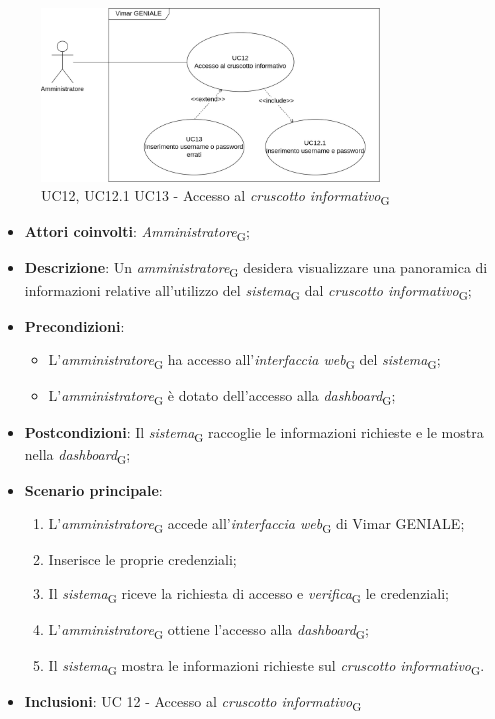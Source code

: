 \begin{figure}[H]
\centering
\includegraphics[width=0.8\textwidth]{contents/casi_duso/png/UC12.png}
\caption{UC12, UC12.1 UC13 - Accesso al \textit{cruscotto informativo}\textsubscript{G} }
\end{figure}

\begin{itemize}
    \item \textbf{Attori coinvolti}: \textit{Amministratore}\textsubscript{G};
    \item \textbf{Descrizione}: Un \textit{amministratore}\textsubscript{G} desidera visualizzare una panoramica di informazioni relative all’utilizzo del \textit{sistema}\textsubscript{G} dal \textit{cruscotto informativo}\textsubscript{G};
    \item \textbf{Precondizioni}: 
        \begin{itemize}
            \item L’\textit{amministratore}\textsubscript{G} ha accesso all’\textit{interfaccia web}\textsubscript{G} del \textit{sistema}\textsubscript{G};
            \item L’\textit{amministratore}\textsubscript{G} è dotato dell’accesso alla \textit{dashboard}\textsubscript{G};
        \end{itemize}
    \item \textbf{Postcondizioni}: Il \textit{sistema}\textsubscript{G} raccoglie le informazioni richieste e le mostra nella \textit{dashboard}\textsubscript{G};
    \item \textbf{Scenario principale}:
    \begin{enumerate}
    \item L’\textit{amministratore}\textsubscript{G} accede all’\textit{interfaccia web}\textsubscript{G} di Vimar GENIALE;
    \item Inserisce le proprie credenziali;
    \item Il \textit{sistema}\textsubscript{G} riceve la richiesta di accesso e \textit{verifica}\textsubscript{G} le credenziali;
    \item L’\textit{amministratore}\textsubscript{G} ottiene l’accesso alla \textit{dashboard}\textsubscript{G};
    \item Il \textit{sistema}\textsubscript{G} mostra le informazioni richieste sul \textit{cruscotto informativo}\textsubscript{G}.
    \end{enumerate}
    \item \textbf{Inclusioni}: UC 12 - Accesso al \textit{cruscotto informativo}\textsubscript{G}
\end{itemize}

